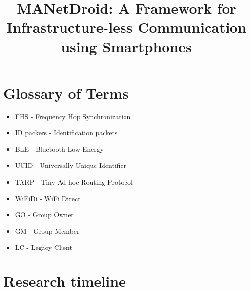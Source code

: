 \documentclass[12pt, conference, onecolumn, a4paper]{IEEEtran}
\title{MANetDroid: A Framework for Infrastructure-less Communication using Smartphones}
\begin{document}
\tableofcontents
\newpage

\section*{Glossary of Terms}
\begin{itemize}
    \item FHS - Frequency Hop Synchronization

    \item ID packers - Identification packets

    \item BLE - Bluetooth Low Energy

    \item UUID - Universally Unique Identifier

    \item TARP - Tiny Ad hoc Routing Protocol

    \item WiFiDi - WiFi Direct

    \item GO - Group Owner

    \item GM - Group Member

    \item LC - Legacy Client

\end{itemize}


\newpage











\section{Research timeline}
\end{document}
